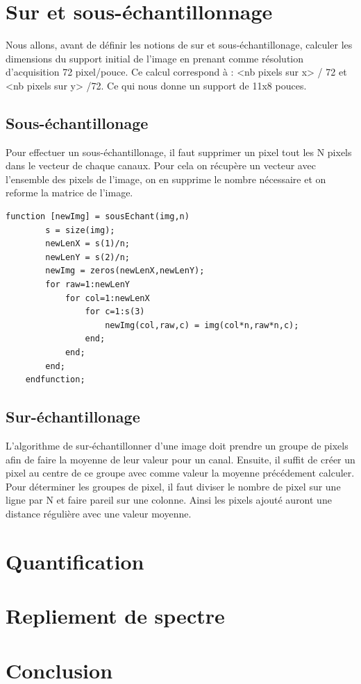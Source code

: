 \documentclass[a4paper,11pt]{article}
\begin{document}
  \section{Sur et sous-échantillonnage}
  Nous allons, avant de définir les notions de sur et sous-échantillonage, calculer les dimensions du support
  initial de l'image en prenant comme résolution d'acquisition 72 pixel/pouce. Ce calcul correspond à :
  <nb pixels sur x> / 72 et <nb pixels sur y> /72. Ce qui nous donne un support de 11x8 pouces.
  
  \subsection{Sous-échantillonage}
  Pour effectuer un sous-échantillonage, il faut supprimer un pixel tout les N pixels dans le vecteur de chaque canaux.
  Pour cela on récupère un vecteur avec l'ensemble des pixels de l'image, on en supprime le nombre nécessaire
  et on reforme la matrice de l'image.\\

  \begin{lstlisting}[caption=Fonction permettant le sous-échantillonnement d'une image]
    function [newImg] = sousEchant(img,n)
        s = size(img);
        newLenX = s(1)/n;
        newLenY = s(2)/n;
        newImg = zeros(newLenX,newLenY);
        for raw=1:newLenY
            for col=1:newLenX
                for c=1:s(3)
                    newImg(col,raw,c) = img(col*n,raw*n,c);
                end;
            end;
        end;
    endfunction;
  \end{lstlisting}
  
  \subsection{Sur-échantillonage}
  L'algorithme de sur-échantillonner d'une image doit prendre un groupe de pixels afin de faire la moyenne de leur valeur
  pour un canal. Ensuite, il suffit de créer un pixel au centre de ce groupe avec comme valeur la moyenne précédement calculer.
  Pour déterminer les groupes de pixel, il faut diviser le nombre de pixel sur une ligne par N et faire pareil sur une colonne.
  Ainsi les pixels ajouté auront une distance régulière avec une valeur moyenne.\\
  \section{Quantification}
  \section{Repliement de spectre}
  
  \section*{Conclusion}
 
    
\end{document}
